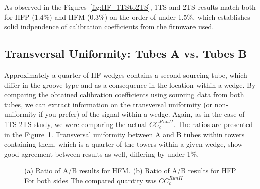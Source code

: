 As observed in the Figures~\ref{fig:HF_1TSto2TS},
1TS and 2TS results match both for HFP (1.4\%) and HFM (0.3\%) on the order of
under 1.5\%, which establishes solid indpendence of calibration coefficients from
the firmware used.

\subsection{Transversal Uniformity: Tubes A vs. Tubes B}
Approximately a quarter of HF wedges contains a second sourcing tube, which
differ in the groove type and as a consequence in the location within a wedge.
By comparing the obtained calibration coefficients using sourcing data from both
tubes, we can extract information on the transversal uniformity (or non-uniformity if you prefer) of the signal
within a wedge. Again, as in the case of 1TS-2TS study, we were comparing the
actual ${CC}^{Run II}_{c}$. The ratios are presented in the Figure~\ref{fig:HF_A2B}.
Transversal uniformity between A and B tubes within towers containing them, which is a quarter
of the towers within a given wedge, show good agreement between results as well, differing by
under 1\%.

\begin{figure}[htb]
    \begin{center}
        \caption
        {(a) Ratio of A/B results for HFM.
         (b) Ratio of A/B results for HFP
         For both sides The compared quantity was ${CC}^{Run II}_{c}$}
        \label{fig:HF_A2B}
    \end{center}
\end{figure}


